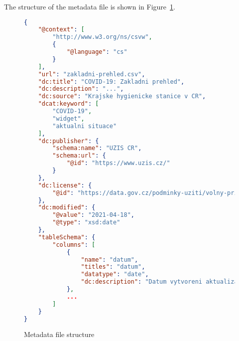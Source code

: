 The structure of the metadata file is shown in Figure~\ref{ls:metadata}.

\begin{figure}[htb]
    \centering
    
    \begin{lstlisting}[language=json,firstnumber=1]
{
    "@context": [
        "http://www.w3.org/ns/csvw",
        {
            "@language": "cs"
        }
    ],
    "url": "zakladni-prehled.csv",
    "dc:title": "COVID-19: Zakladni prehled",
    "dc:description": "...",
    "dc:source": "Krajske hygienicke stanice v CR",
    "dcat:keyword": [
        "COVID-19",
        "widget",
        "aktualni situace"
    ],
    "dc:publisher": {
        "schema:name": "UZIS CR",
        "schema:url": {
            "@id": "https://www.uzis.cz/"
        }
    },
    "dc:license": {
        "@id": "https://data.gov.cz/podminky-uziti/volny-pristup/"
    },
    "dc:modified": {
        "@value": "2021-04-18",
        "@type": "xsd:date"
    },
    "tableSchema": {
        "columns": [
            {
                "name": "datum",
                "titles": "datum",
                "datatype": "date",
                "dc:description": "Datum vytvoreni aktualizace."
            },
            ...
        ]
    }
}
    \end{lstlisting}

    \caption{Metadata file structure}
    \label{ls:metadata}
\end{figure}
\FloatBarrier
